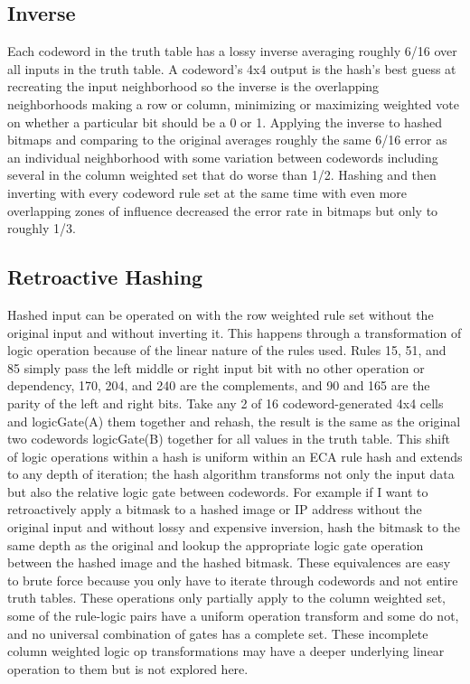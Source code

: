 \documentclass[11pt]{article}
\begin{document}
\subsection{Inverse}
Each codeword in the truth table has a lossy inverse averaging roughly 6/16 over all inputs in the truth table. A codeword's 4x4 output is the hash's best guess at recreating the input neighborhood so the inverse is the overlapping neighborhoods making a row or column, minimizing or maximizing weighted vote on whether a particular bit should be a 0 or 1. Applying the inverse to hashed bitmaps and comparing to the original averages roughly the same 6/16 error as an individual neighborhood with some variation between codewords including several in the column weighted set that do worse than 1/2. Hashing and then inverting with every codeword rule set at the same time with even more overlapping zones of influence decreased the error rate in bitmaps but only to roughly 1/3. \\

\subsection{Retroactive Hashing}
Hashed input can be operated on with the row weighted rule set without the original input and without inverting it. This happens through a transformation of logic operation because of the linear nature of the rules used. Rules 15, 51, and 85 simply pass the left middle or right input bit with no other operation or dependency, 170, 204, and 240 are the complements, and 90 and 165 are the parity of the left and right bits. Take any 2 of 16 codeword-generated 4x4 cells and logicGate(A) them together and rehash, the result is the same as the original two codewords logicGate(B) together for all values in the truth table. This shift of logic operations within a hash is uniform within an ECA rule hash and extends to any depth of iteration; the hash algorithm transforms not only the input data but also the relative logic gate between codewords. For example if I want to retroactively apply a bitmask to a hashed image or IP address without the original input and without lossy and expensive inversion, hash the bitmask to the same depth as the original and lookup the appropriate logic gate operation between the hashed image and the hashed bitmask. These equivalences are easy to brute force because you only have to iterate through codewords and not entire truth tables. These operations only partially apply to the column weighted set, some of the rule-logic pairs have a uniform operation transform and some do not, and no universal combination of gates has a complete set.  These incomplete column weighted logic op transformations may have a deeper underlying linear operation to them but is not explored here.\\
\end{document}
